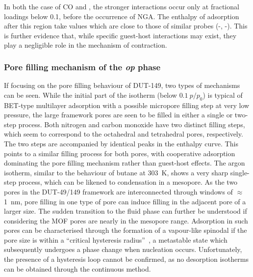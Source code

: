 In both the case of CO and , the 
stronger interactions occur only at fractional loadings below 0.1, 
before the occurrence of NGA. The enthalpy of 
adsorption after this region take values which are close to
those of similar probes (-, -).
This is further evidence that, while specific guest-host interactions
may exist, they play a negligible role in the mechanism of contraction.

\subsubsection{Pore filling mechanism of the \textit{op} phase}

If focusing on the pore filling behaviour of DUT-149, two types
of mechanisms can be seen. While the initial part of the isotherm 
(below \(0.1~p/p_0\)) is typical of BET-type multilayer adsorption
with a possible micropore filling step at very low pressure,
the large framework pores are seen to be filled in either a single or
two-step process.
Both nitrogen and carbon monoxide have two distinct filling
steps, which seem to correspond to the octahedral and tetrahedral pores,
respectively. The two steps are accompanied by identical 
peaks in the enthalpy curve. This points to a similar 
filling process for both pores, with cooperative adsorption
dominating the pore filling mechanism rather than guest-host 
effects. The argon isotherm, similar to the behaviour of 
butane at \SI{303}{\kelvin}, shows a very sharp single-step process,
which can be likened to condensation in a mesopore. As the 
two pores in the DUT-49/149 framework are interconnected through 
windows of \(\approx\)\SI{1}{\nano\metre}, pore filling 
in one type of pore can induce filling in the adjacent pore of 
a larger size. The sudden transition to the fluid phase can further
be understood if considering the MOF pores are nearly in the mesopore 
range. Adsorption in such pores can be characterised through 
the formation of a vapour-like spinodal if the pore size is within
a ``critical hysteresis radius''~\cite{hiratsukaCriticalEnergyBarrier2016},
a metastable state which subsequently undergoes a phase change when
nucleation occurs. Unfortunately, the presence of a hysteresis loop
cannot be confirmed, as no desorption isotherms can be obtained 
through the continuous method.

